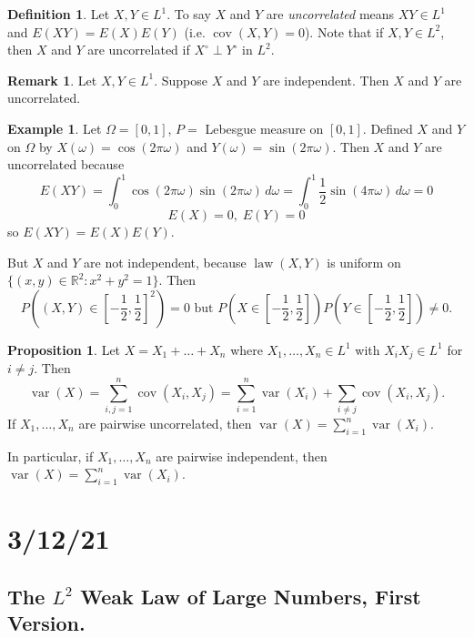 \documentclass{article}
\DeclareMathOperator{\law}{law}
\newcommand{\R}{\mathbb{R}}
\DeclareMathOperator{\var}{var}
\DeclareMathOperator{\cov}{cov}
\theoremstyle{definition}
\newtheorem{proposition}[theorem]{Proposition}
\newtheorem*{example}{Example}
\newtheorem*{definition}{Definition}
\newtheorem*{remark}{Remark}
\begin{document}
\begin{definition}
    Let $X, Y \in L^1$. To say $X$ and $Y$ are \emph{uncorrelated} means $XY \in L^1$ and $E(XY) = E(X)E(Y)$ (i.e. $\cov(X,Y) = 0$). Note that if $X, Y \in L^2$, then $X$ and $Y$ are uncorrelated if $X^\circ \perp Y^\circ$ in $L^2$.
\end{definition}

\begin{remark}
     Let $X, Y \in L^1$. Suppose $X$ and $Y$ are independent. Then $X$ and $Y$ are uncorrelated.
\end{remark}

\begin{example}
Let $\Omega = [0,1]$, $P =$ Lebesgue measure on $[0,1]$. Defined $X$ and $Y$ on $\Omega$ by $X(\omega) = \cos(2\pi\omega)$ and $Y(\omega) = \sin(2\pi\omega)$. Then $X$ and $Y$ are uncorrelated because
\[
    E(XY) = \int_0^1 \cos(2\pi\omega)\sin(2\pi\omega)\,d\omega = \int_0^1 \frac{1}{2}\sin(4\pi\omega)\,d\omega = 0
\]
\[
    E(X) = 0, \; E(Y) = 0
\]
so $E(XY) = E(X)E(Y)$.

But $X$ and $Y$ are not independent, because $\law(X,Y)$ is uniform on $\{(x,y) \in \R^2 : x^2 + y^2  = 1\}$. Then
\[
    P\left((X,Y) \in \left[-\frac{1}{2}, \frac{1}{2}\right]^2\right) = 0
    \text{ but }
    P\left(X \in \left[-\frac{1}{2},\frac{1}{2}\right]\right)P\left(Y \in \left[-\frac{1}{2},\frac{1}{2}\right]\right) \neq 0.
\]
\end{example}

\begin{proposition}
Let $X = X_1 + \dots + X_n$ where $X_1, \dots, X_n \in L^1$ with $X_i X_j \in L^1$ for $i \neq j$. Then
\[
    \var(X) = \sum_{i,j=1}^n \cov(X_i,X_j) = \sum_{i=1}^n \var(X_i) + \sum_{i \neq j} \cov(X_i, X_j).
\]
If $X_1, \dots, X_n$ are pairwise uncorrelated, then $\var(X) = \sum_{i=1}^n \var(X_i)$.

In particular, if $X_1, \dots, X_n$ are pairwise independent, then $\var(X) = \sum_{i=1}^n \var(X_i)$.
\end{proposition}

\section*{3/12/21}

\subsection*{The $L^2$ Weak Law of Large Numbers, First Version.}
\end{document}
